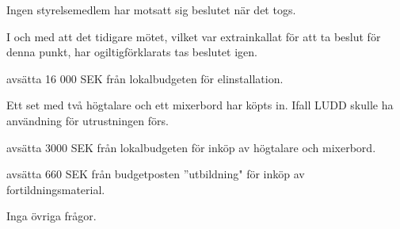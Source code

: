\documentclass{protokoll}
\begin{document}
Ingen styrelsemedlem har motsatt sig beslutet när det togs.

I och med att det tidigare mötet, vilket var extrainkallat för att ta beslut
för denna punkt, har ogiltigförklarats tas beslutet igen. 
\begin{beslut}
  \att avsätta 16 000 SEK från lokalbudgeten för elinstallation.
\end{beslut}

Ett set med två högtalare och ett mixerbord har köpts in.  
Ifall LUDD skulle ha användning för utrustningen förs. 
\begin{beslut}
  \att avsätta 3000 SEK från lokalbudgeten för inköp av högtalare och
  mixerbord. 
\end{beslut}


\begin{beslut}
  \att avsätta 660 SEK från budgetposten ''utbildning" för inköp av
  fortildningsmaterial.
\end{beslut}

Inga övriga frågor.
\end{document}
